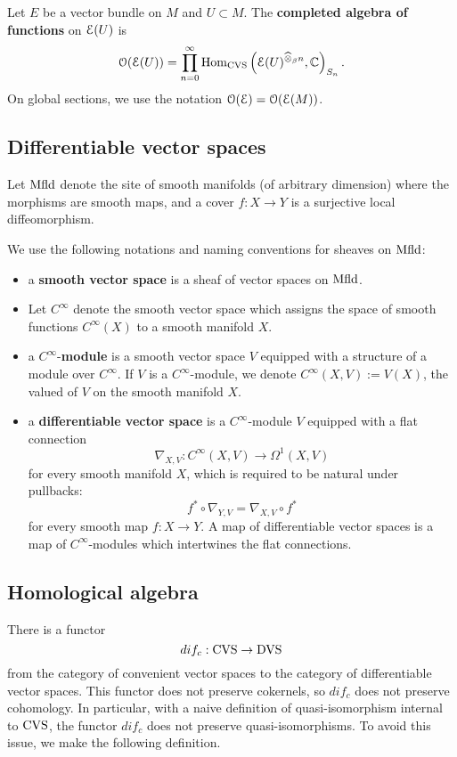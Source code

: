 \documentclass[10pt, oneside]{article}
\begin{document}
\begin{definition}\label{dfn: fnl}
Let $E$ be a vector bundle on $M$ and $U \subset M$.
The {\bf completed algebra of functions} on $\mathcal E(U)$ is
\[
\mathcal O(\mathcal E(U)) = \prod_{n = 0}^\infty {\rm Hom}_{\rm CVS} \left(\mathcal E(U)^{\widehat{\otimes}_\beta n}, \mathbb C\right)_{S_n} .
\]
On global sections, we use the notation $\mathcal O(\mathcal E) = \mathcal O(\mathcal E(M))$. 
\end{definition}

\subsection{Differentiable vector spaces}
\def\Mfld{{\rm Mfld}}

Let $\Mfld$ denote the site of smooth manifolds (of arbitrary dimension) where the morphisms are smooth maps, and a cover $f : X \to Y$ is a surjective local diffeomorphism.  

\begin{definition} 
We use the following notations and naming conventions for sheaves on $\Mfld$:
\begin{itemize}
\item a {\bf smooth vector space} is a sheaf of vector spaces on $\Mfld$.
\item Let $C^\infty$ denote the smooth vector space which assigns the space of smooth functions $C^\infty(X)$ to a smooth manifold $X$.
\item a $C^\infty$-{\bf module} is a smooth vector space $V$ equipped with a structure of a module over $C^\infty$. 
If $V$ is a $C^\infty$-module, we denote $C^\infty(X, V) := V(X)$, the valued of $V$ on the smooth manifold $X$.
\item a {\bf differentiable vector space} is a $C^\infty$-module $V$ equipped with a flat connection
\[
\nabla_{X,V} : C^\infty(X, V) \to \Omega^1(X, V)
\]
for every smooth manifold $X$, which is required to be natural under pullbacks:
\[
f^* \circ \nabla_{Y,V} = \nabla_{X,V} \circ f^*
\]
for every smooth map $f : X \to Y$. 
A map of differentiable vector spaces is a map of $C^\infty$-modules which intertwines the flat connections. 
\end{itemize}
\end{definition}

\subsection{Homological algebra}

There is a functor
\[
dif_c : {\rm CVS} \to {\rm DVS} 
\]
from the category of convenient vector spaces to the category of differentiable vector spaces. 
This functor does not preserve cokernels, so $dif_c$ does not preserve cohomology. 
In particular, with a naive definition of quasi-isomorphism internal to ${\rm CVS}$, the functor $dif_c$ does not preserve quasi-isomorphisms. 
To avoid this issue, we make the following definition. 
\end{document}
